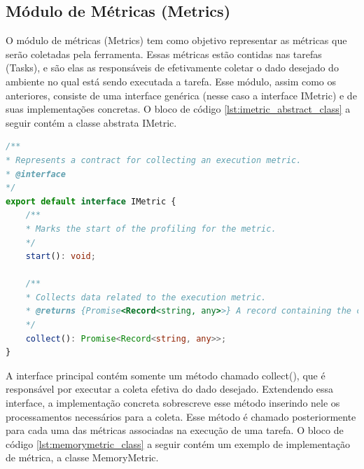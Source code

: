 \documentclass[12pt]{tcc}
\begin{document}
\subsection{Módulo de Métricas (Metrics)}
\label{subsection:modulo-metrics}

O módulo de métricas (Metrics) tem como objetivo representar as métricas que serão coletadas pela ferramenta. Essas métricas estão contidas nas tarefas (Tasks), e são elas as responsáveis de efetivamente coletar o dado desejado do ambiente no qual está sendo executada a tarefa. Esse módulo, assim como os anteriores, consiste de uma interface genérica (nesse caso a interface IMetric) e de suas implementações concretas. O bloco de código \ref{lst:imetric_abstract_class} a seguir contém a classe abstrata IMetric.

\begin{lstlisting}[label={lst:imetric_abstract_class}, caption={Implementação da classe responsável por representar uma métrica.}, language=TypeScript, breaklines=true]
/**
* Represents a contract for collecting an execution metric.
* @interface
*/
export default interface IMetric {
	/**
	* Marks the start of the profiling for the metric.
	*/
	start(): void;

	/**
	* Collects data related to the execution metric.
	* @returns {Promise<Record<string, any>>} A record containing the collected metric data.
	*/
	collect(): Promise<Record<string, any>>;
}
\end{lstlisting}

A interface principal contém somente um método chamado collect(), que é responsável por executar a coleta efetiva do dado desejado. Extendendo essa interface, a implementação concreta sobrescreve esse método inserindo nele os processamentos necessários para a coleta. Esse método é chamado posteriormente para cada uma das métricas associadas na execução de uma tarefa. O bloco de código \ref{lst:memorymetric_class} a seguir contém um exemplo de implementação de métrica, a classe MemoryMetric.
\end{document}

